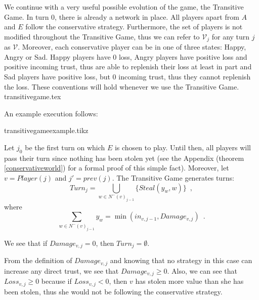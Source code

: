    We continue with a very useful possible evolution of the game, the Transitive Game. In turn 0, there is already a network
   in place. All players apart from $A$ and $E$ follow the conservative strategy. Furthermore, the set of players is not
   modified throughout the Transitive Game, thus we can refer to $\mathcal{V}_j$ for any turn $j$ as $\mathcal{V}$.
   Moreover, each conservative player can be in one of three states: Happy, Angry or Sad. Happy players have 0 loss, Angry
   players have positive loss and positive incoming trust, thus are able to replenish their loss at least in part and
   Sad players have positive loss, but 0 incoming trust, thus they cannot replenish the loss. These conventions will hold
   whenever we use the Transitive Game.
   {transitivegame.tex}

   An example execution follows:

   {transitivegameexample.tikz}

   Let $j_0$ be the first turn on which $E$ is chosen to play. Until then, all players will pass their turn since nothing
   has been stolen yet (see the Appendix (theorem \ref{conservativeworld}) for a formal proof of this simple fact).
   Moreover, let $v = Player(j)$ and $j' = prev\left(j\right)$.
   The Transitive Game generates turns:
   \begin{equation}
      Turn_j = \bigcup\limits_{w \in N^{-}\left(v\right)_{j-1}}\{Steal\left(y_w,w\right)\} \enspace,
   \end{equation}
   where
   \begin{equation*}
      \sum\limits_{w \in N^{-}\left(v\right)_{j-1}}y_w = \min\left(in_{v, j-1}, Damage_{v, j}\right) \enspace.
   \end{equation*}
 
   We see that if $Damage_{v, j} = 0$, then $Turn_j = \emptyset$.

   From the definition of $Damage_{v,j}$ and knowing that no strategy in this case can increase any direct trust, we see
   that $Damage_{v,j} \geq 0$. Also, we can see that $Loss_{v,j} \geq 0$ because if $Loss_{v,j} < 0$, then $v$ has
   stolen more value than she has been stolen, thus she would not be following the conservative strategy.
